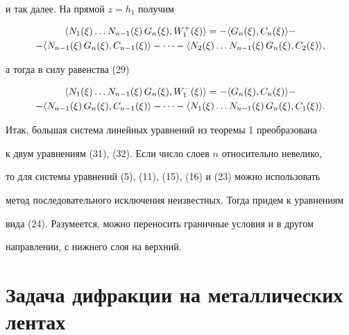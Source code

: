 и так далее. На прямой $z=h_1$ получим


\begin{multline*}


\scpr{N_1(\xi)\dotsc N_{n-1}(\xi)\,G_n(\xi)}{W_1^+(\xi)} =


- \scpr{G_n(\xi)}{C_n(\xi)} -\\


%


- \scpr{N_{n-1}(\xi)\,G_n(\xi)}{C_{n-1}(\xi)} - \dotsb


- \scpr{N_2(\xi)\dotsc N_{n-1}(\xi)\,G_n(\xi)}{C_2(\xi)} ,


\end{multline*}


а тогда в силу равенства (29)


\begin{multline}


\scpr{N_1(\xi)\dotsc N_{n-1}(\xi)\,G_n(\xi)}{W_1^-(\xi)} =


- \scpr{G_n(\xi)}{C_n(\xi)} -\\


%


- \scpr{N_{n-1}(\xi)\,G_n(\xi)}{C_{n-1}(\xi)} - \dotsb


- \scpr{N_1(\xi)\dotsc N_{n-1}(\xi)\,G_n(\xi)}{C_1(\xi)} .


\end{multline}





Итак, большая система линейных уравнений из теоремы 1 преобразована


к двум уравнениям (31), (32). Если число слоев $n$ относительно невелико,


то для системы уравнений (5), (11), (15), (16) и (23) можно использовать


метод последовательного исключения неизвестных. Тогда придем к уравнениям


вида (24). Разумеется, можно переносить граничные условия и в другом


направлении, с нижнего слоя на верхний.








\section{Задача дифракции на металлических лентах}





